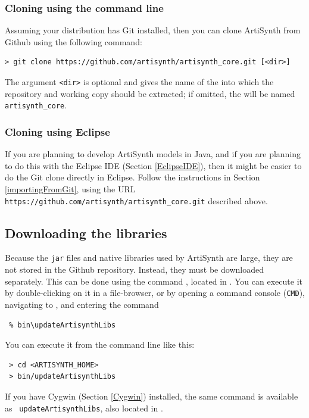 \else
\subsubsection{Cloning using the command line}

Assuming your \SYSTEM{} distribution has Git installed, then you can
clone ArtiSynth from Github using the following command:
%
\begin{lstlisting}[]
 > git clone https://github.com/artisynth/artisynth_core.git [<dir>]
\end{lstlisting}
%
The argument {\tt <dir>} is optional and gives the name of the
\directory{} into which the repository and working copy should be
extracted; if omitted, the \directory{} will be named {\tt
artisynth\_core}.
\fi

\subsubsection{Cloning using Eclipse}
\label{ArtiSynthEclipseCheckout}

If you are planning to develop ArtiSynth models in Java, and if you
are planning to do this with the Eclipse IDE
(Section \ref{EclipseIDE}), then it might be easier to do the Git
clone directly in Eclipse.  Follow the instructions in
Section \ref{importingFromGit}, using the URL {\tt
https://github.com/artisynth/artisynth\_core.git} described above.

\subsection{Downloading the libraries}
\label{DownloadingLibraries}

Because the {\tt jar} files and native libraries used by ArtiSynth
are large, they are not stored in the Github repository.
Instead, they must be downloaded separately. This can be
done using the command \updateArtisynthLibs, located
in .
\ifWindows
You can execute it by double-clicking on it in a file-browser, or
by opening a command console ({\tt CMD}), navigating
to \ArtHome[], and entering the command
\begin{verbatim}
 % bin\updateArtisynthLibs
\end{verbatim}
\else
You can execute it from the command line like this:
\begin{verbatim}
 > cd <ARTISYNTH_HOME>
 > bin/updateArtisynthLibs
\end{verbatim}
\fi

\ifWindows
If you have Cygwin (Section \ref{Cygwin}) installed, 
the same command is available as {\tt
updateArtisynthLibs}, also located in .
\else\fi


